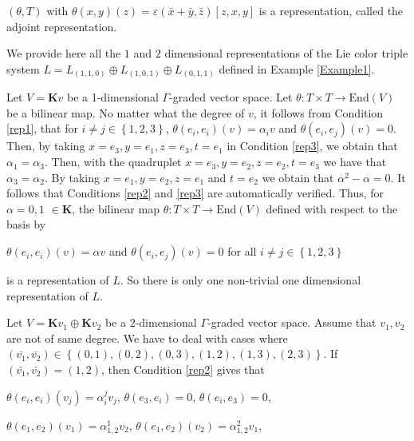 \documentclass[11pt, twoside]{article}
\begin{document}
\begin{ex}
     $(\theta,T)$ with $\theta(x,y)(z)=\varepsilon(\bar{x}+\bar{y},\bar{z})[z,x,y] $ is a representation, called the adjoint representation.
\end{ex}

\begin{ex}
    We provide here all the $1$ and $2$ dimensional representations   of the Lie color triple system $L=L_{(1,1,0)}\oplus L_{(1,0,1)} \oplus L_{(0,1,1)} $ defined in Example \ref{Example1}. 
    
    Let $V= \mathbf{K}v$ be a 1-dimensional $\Gamma $-graded vector space. Let $\theta:T\times T\to \mathrm{End}(V) $ be a bilinear map. No matter what the degree of $v$, it follows from  Condition \eqref{rep1}, that for $i\neq j \in \left\{1,2,3 \right\} $, $\theta(e_i,e_i)(v)= \alpha_iv  $  and $\theta(e_i,e_j)(v)=0 $. Then, by taking $x=e_3,y=e_1,z=e_3,t=e_1 $ in  Condition \eqref{rep3}, we obtain that $\alpha_{1}=\alpha_3 $. Then, with the quadruplet $x=e_3,y=e_2,z=e_2,t=e_3 $ we have that $\alpha_{3}=\alpha_2 $. By taking $x=e_1,y=e_2,z=e_1$ and $t=e_2$ we obtain that $\alpha^2-\alpha=0 $. It follows that Conditions \eqref{rep2} and \eqref{rep3} are automatically verified. Thus, for $\alpha=0,1$ $\in \mathbf{K}$, the bilinear map $\theta:T\times T\to \mathrm{End}(V) $ defined with respect to  the basis by \begin{center}
          $\theta(e_i,e_i)(v)= \alpha v  $   and $\theta(e_i,e_j)(v)=0 $  for all $i\neq j \in \left\{1,2,3 \right\}$
    \end{center} is a representation of $L$. So there is only one non-trivial one dimensional representation of $L$.
    
    Let $V=\mathbf{K}v_1 \oplus \mathbf{K}v_2 $ be a $2$-dimensional $\Gamma $-graded vector space. Assume that $v_1,v_2$ are not of same degree. We have to deal with cases where $(\bar{v_1},\bar{v_2})\in \left\{(0,1),(0,2),(0,3),(1,2),(1,3),(2,3) \right\} $. If $(\bar{v_1},\bar{v_2})=(1,2) $, then Condition \eqref{rep2} gives that \begin{center}
        $\theta(e_i,e_i)(v_j)= \alpha_{i}^jv_j $, $\theta(e_3,e_i)=0 $, $\theta(e_i,e_3)=0 $, 

        $\theta(e_1,e_2)(v_1)= \alpha_{1,2}^1v_2 $, $\theta(e_1,e_2)(v_2)= \alpha_{1,2}^2v_1 $, 


\end{center}
\end{ex}
\end{document}
